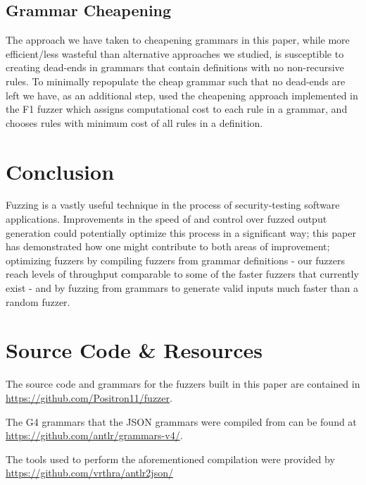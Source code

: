 \documentclass[8pt, twoside]{extarticle}
\begin{document}
\subsection{Grammar Cheapening}

The approach we have taken to cheapening grammars in this paper, while more efficient/less wasteful than alternative approaches we studied, is susceptible to creating dead-ends in grammars that contain definitions with no non-recursive rules. To minimally repopulate the cheap grammar such that no dead-ends are left we have, as an additional step, used the cheapening approach implemented in the F1 fuzzer \cite{Gopinath_2019} which assigns computational cost to each rule in a grammar, and chooses rules with minimum cost of all rules in a definition.

\section{Conclusion}

Fuzzing is a vastly useful technique in the process of security-testing software applications. Improvements in the speed of and control over fuzzed output generation could potentially optimize this process in a significant way; this paper has demonstrated how one might contribute to both areas of improvement; optimizing fuzzers by compiling fuzzers from grammar definitions - our fuzzers reach levels of throughput comparable to some of the faster fuzzers that currently exist - and by fuzzing from grammars to generate valid inputs much faster than a random fuzzer.




\appendix

\section{Source Code \& Resources}

The source code and grammars for the fuzzers built in this paper are contained in \url{https://github.com/Positron11/fuzzer}. 

The G4 grammars that the JSON grammars were compiled from can be found at \url{https://github.com/antlr/grammars-v4/}. 

The tools used to perform the aforementioned compilation were provided by \url{https://github.com/vrthra/antlr2json/}
\end{document}

